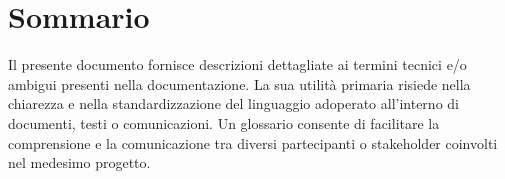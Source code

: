 \documentclass{article}
\begin{document}
\pagebreak

\maketitle
\thispagestyle{fancy}
\tableofcontents
\pagebreak


\section*{Sommario}
Il presente documento fornisce descrizioni dettagliate ai termini tecnici e/o ambigui presenti nella documentazione.
La sua utilità primaria risiede nella chiarezza e nella standardizzazione del linguaggio adoperato all'interno di documenti, testi o comunicazioni. Un glossario consente di facilitare la comprensione e la comunicazione tra diversi partecipanti o stakeholder coinvolti nel medesimo progetto.

\end{document}
